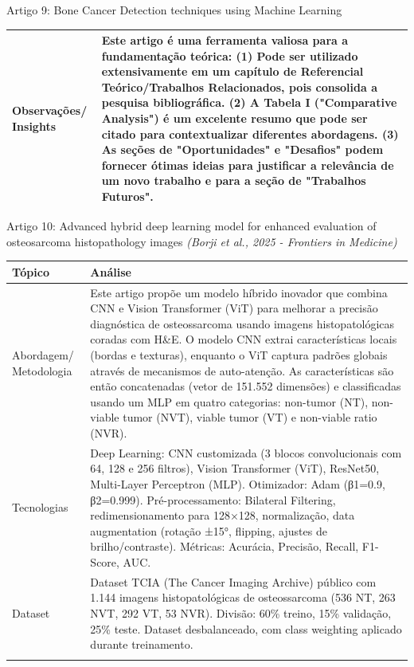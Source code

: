 \documentclass[12pt, a4paper]{article}
\begin{document}
\begin{fichabox}{Artigo 9: Bone Cancer Detection techniques using Machine Learning}
\begin{longtable}{@{} B L{10.5cm} @{}}
    Observações/ Insights & \textbf{Este artigo é uma ferramenta valiosa para a fundamentação teórica:} (1) Pode ser utilizado extensivamente em um capítulo de Referencial Teórico/Trabalhos Relacionados, pois consolida a pesquisa bibliográfica. (2) A Tabela I ("Comparative Analysis") é um excelente resumo que pode ser citado para contextualizar diferentes abordagens. (3) As seções de "Oportunidades" e "Desafios" podem fornecer ótimas ideias para justificar a relevância de um novo trabalho e para a seção de "Trabalhos Futuros". \\
    
    \bottomrule
\end{longtable}
\end{fichabox}

\begin{fichabox}{Artigo 10: Advanced hybrid deep learning model for enhanced evaluation of osteosarcoma histopathology images}
\textit{(Borji et al., 2025 - Frontiers in Medicine)}

\begin{longtable}{@{} B L{10.5cm} @{}}
    \toprule
    \textbf{Tópico} & \textbf{Análise} \\
    \midrule
    \endhead

    Abordagem/ Metodologia & Este artigo propõe um modelo híbrido inovador que combina CNN e Vision Transformer (ViT) para melhorar a precisão diagnóstica de osteossarcoma usando imagens histopatológicas coradas com H\&E. O modelo CNN extrai características locais (bordas e texturas), enquanto o ViT captura padrões globais através de mecanismos de auto-atenção. As características são então concatenadas (vetor de 151.552 dimensões) e classificadas usando um MLP em quatro categorias: non-tumor (NT), non-viable tumor (NVT), viable tumor (VT) e non-viable ratio (NVR). \\
    \addlinespace

    Tecnologias & Deep Learning: CNN customizada (3 blocos convolucionais com 64, 128 e 256 filtros), Vision Transformer (ViT), ResNet50, Multi-Layer Perceptron (MLP). Otimizador: Adam (β1=0.9, β2=0.999). Pré-processamento: Bilateral Filtering, redimensionamento para 128×128, normalização, data augmentation (rotação ±15°, flipping, ajustes de brilho/contraste). Métricas: Acurácia, Precisão, Recall, F1-Score, AUC. \\
    \addlinespace

    Dataset & Dataset TCIA (The Cancer Imaging Archive) público com 1.144 imagens histopatológicas de osteossarcoma (536 NT, 263 NVT, 292 VT, 53 NVR). Divisão: 60\% treino, 15\% validação, 25\% teste. Dataset desbalanceado, com class weighting aplicado durante treinamento. \\
    \addlinespace


\end{longtable}
\end{fichabox}
\end{document}
